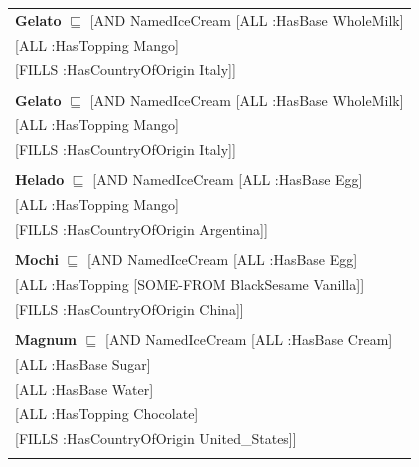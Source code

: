 \documentclass[12pt]{article}
\newcommand*{\MyIndent}{\hspace*{7em}}
\begin{document}
\begin{tabularx}{1\textwidth}{@{}X@{}}
            \textbf{Gelato} $\sqsubseteq$ [AND NamedIceCream [ALL :HasBase WholeMilk] \\
                                                   \MyIndent [ALL :HasTopping Mango] \\
                                                   \MyIndent [FILLS :HasCountryOfOrigin Italy]] \\
                                                   \tabularnewline
            
            \textbf{Gelato} $\sqsubseteq$ [AND NamedIceCream [ALL :HasBase WholeMilk] \\
                                                   \MyIndent [ALL :HasTopping Mango] \\
                                                   \MyIndent [FILLS :HasCountryOfOrigin Italy]] \\
                                                   \tabularnewline
            
            \textbf{Helado} $\sqsubseteq$ [AND NamedIceCream [ALL :HasBase Egg] \\
                                                   \MyIndent [ALL :HasTopping Mango] \\
                                                   \MyIndent [FILLS :HasCountryOfOrigin Argentina]] \\
                                                   \tabularnewline

            \textbf{Mochi} $\sqsubseteq$ [AND NamedIceCream [ALL :HasBase Egg] \\
                                                  \MyIndent [ALL :HasTopping [SOME-FROM BlackSesame Vanilla]] \\
                                                  \MyIndent [FILLS :HasCountryOfOrigin China]] \\
                                                  \tabularnewline

            \textbf{Magnum} $\sqsubseteq$ [AND NamedIceCream [ALL :HasBase Cream] \\
                                                   \MyIndent [ALL :HasBase Sugar] \\
                                                   \MyIndent [ALL :HasBase Water] \\
                                                   \MyIndent [ALL :HasTopping Chocolate] \\
                                                   \MyIndent [FILLS :HasCountryOfOrigin United\_States]] \\
                                                   \tabularnewline


\end{tabularx}
\end{document}
